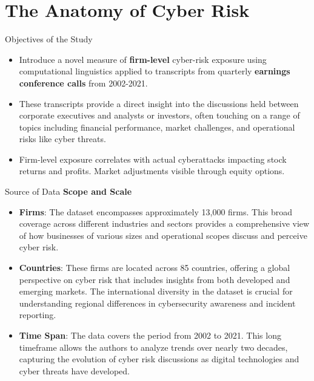 \documentclass[11pt]{beamer}
\begin{document}
\section{The Anatomy of Cyber Risk \\ }
\begin{frame}{Objectives of the Study}
	\begin{itemize}
		\item Introduce a novel measure of \textbf{firm-level} cyber-risk exposure using computational linguistics applied to transcripts from quarterly \textbf{earnings conference calls} from 2002-2021.

		\item These transcripts provide a direct insight into the discussions held between corporate executives and analysts or investors, often touching on a range of topics including financial performance, market challenges, and operational risks like cyber threats.

		\item Firm-level exposure correlates with actual cyberattacks impacting stock returns and profits. Market adjustments visible through equity options.

	\end{itemize}
\end{frame}
\begin{frame}{Source of Data}
\textbf{Scope and Scale}

	\begin{itemize}
		\item \textbf{Firms}: The dataset encompasses approximately 13,000 firms. This broad coverage across different industries and sectors provides a comprehensive view of how businesses of various sizes and operational scopes discuss and perceive cyber risk.

		\item \textbf{Countries}: These firms are located across 85 countries, offering a global perspective on cyber risk that includes insights from both developed and emerging markets. The international diversity in the dataset is crucial for understanding regional differences in cybersecurity awareness and incident reporting.

		\item \textbf{Time Span}: The data covers the period from 2002 to 2021. This long timeframe allows the authors to analyze trends over nearly two decades, capturing the evolution of cyber risk discussions as digital technologies and cyber threats have developed.

	\end{itemize}
\end{frame}
\end{document}
